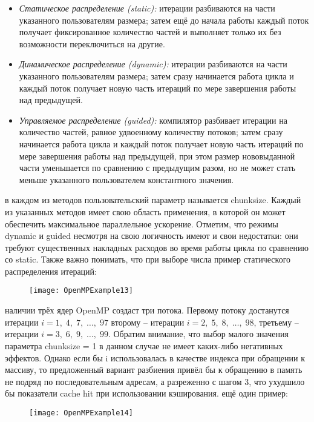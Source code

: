 {\begin{itemize}
		\item\textit{Статическое распределение (static):} итерации разбиваются на части указанного пользователям размера; затем ещё до начала работы каждый поток получает фиксированное количество частей и выполняет только их без возможности переключиться на другие.
		\item\textit{Динамическое распределение (dynamic):} итерации разбиваются на части указанного пользователям размера; затем сразу начинается работа цикла и каждый поток получает новую часть итераций по мере завершения работы над предыдущей.
		\item\textit{Управляемое распределение (guided):} компилятор разбивает итерации на количество частей, равное удвоенному количеству потоков; затем сразу начинается работа цикла и каждый поток получает новую часть итераций по мере завершения работы над предыдущей, при этом размер нововыданной части уменьшается по сравнению с предыдущим разом, но не может стать меньше указанного пользователем константного значения.
	\end{itemize}
	 в каждом из методов пользовательский параметр называется chunk\textunderscore size. Каждый из указанных методов имеет свою область применения, в которой он может обеспечить максимальное параллельное ускорение. Отметим, что режимы dynamic и guided несмотря на свою логичность имеют и свои недостатки: они требуют существенных накладных расходов во время работы цикла по сравнению со static. Также важно понимать, что при выборе числа
	 пример статического распределения итераций:
	\begin{figure}[H]
		\texttt{[image: OpenMPExample13]}
	\end{figure}
	 наличии трёх ядер OpenMP создаст три потока. Первому потоку достанутся итерации $i=1,\;4,\;7,\;…,\;97$ второму – итерации $i=2,\;5,\;8,\;…,\;98$, третьему – итерации $i=3,\;6,\;9,\;…,\;99$. Обратим внимание, что выбор малого значения параметра chunk\textunderscore size = 1 в данном случае не имеет каких-либо негативных эффектов. Однако если бы i использовалась в качестве индекса при обращении к массиву, то предложенный вариант разбиения привёл бы к обращению в память не подряд по последовательным адресам, а разреженно с шагом 3, что ухудшило бы показатели cache hit при использовании кэширования.
	 ещё один пример: 
	\begin{figure}[H]
		\texttt{[image: OpenMPExample14]}
	\end{figure}
}
